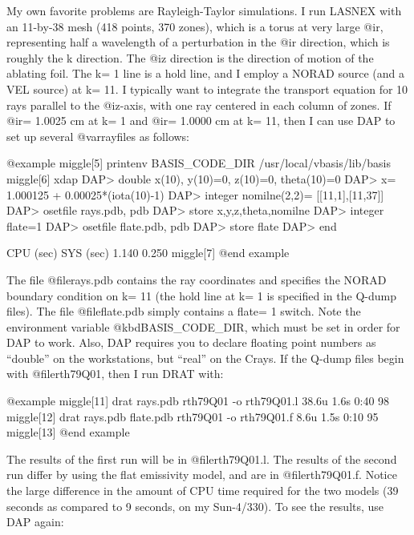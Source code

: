 My own favorite problems are Rayleigh-Taylor simulations.  I run LASNEX
with an 11-by-38 mesh (418 points, 370 zones), which is a torus at very
large @i{r}, representing half a wavelength of a perturbation in the
@i{r} direction, which is roughly the k direction.  The @i{z} direction
is the direction of motion of the ablating foil.  The k= 1 line is a
hold line, and I employ a NORAD source (and a VEL source) at k= 11.  I
typically want to integrate the transport equation for 10 rays parallel
to the @i{z}-axis, with one ray centered in each column of zones.  If
@i{r}= 1.0025 cm at k= 1 and @i{r}= 1.0000 cm at k= 11, then I can use
DAP to set up several @var{rayfiles} as follows:

@example
miggle[5] printenv BASIS_CODE_DIR
/usr/local/vbasis/lib/basis
miggle[6] xdap
DAP> double x(10), y(10)=0, z(10)=0, theta(10)=0
DAP> x= 1.000125 + 0.00025*(iota(10)-1)
DAP> integer nomilne(2,2)= [[11,1],[11,37]]
DAP> osetfile rays.pdb, pdb
DAP> store x,y,z,theta,nomilne
DAP> integer flate=1
DAP> osetfile flate.pdb, pdb
DAP> store flate
DAP> end

   CPU (sec)    SYS (sec)
       1.140       0.250
miggle[7] 
@end example

The file @file{rays.pdb} contains the ray coordinates and specifies the
NORAD boundary condition on k= 11 (the hold line at k= 1 is specified in
the Q-dump files).  The file @file{flate.pdb} simply contains a flate= 1
switch.  Note the environment variable @kbd{BASIS_CODE_DIR}, which must
be set in order for DAP to work.  Also, DAP requires you to declare
floating point numbers as ``double'' on the workstations, but ``real''
on the Crays.  If the Q-dump files begin with @file{rth79Q01}, then I
run DRAT with:

@example
miggle[11] drat rays.pdb rth79Q01 -o rth79Q01.l
38.6u 1.6s 0:40 98%
miggle[12] drat rays.pdb flate.pdb rth79Q01 -o rth79Q01.f
8.6u 1.5s 0:10 95%
miggle[13] 
@end example

The results of the first run will be in @file{rth79Q01.l}.  The results
of the second run differ by using the flat emissivity model, and are in
@file{rth79Q01.f}.  Notice the large difference in the amount of CPU
time required for the two models (39 seconds as compared to 9 seconds,
on my Sun-4/330).  To see the results, use DAP again:

